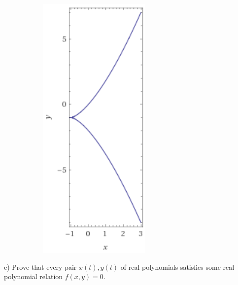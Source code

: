 \documentclass{article}
\theoremstyle{definition}
\begin{document}
\begin{figure}[h]
\begin{subfigure}{0.5 \textwidth}
        \includegraphics[scale=0.5]{f}
    \end{subfigure}
\end{figure}

\begin{tcolorbox}
c) Prove that every pair $x(t), y(t)$ of real polynomials satisfies some real polynomial relation $f(x,y)=0$.
\end{tcolorbox}
\end{document}
